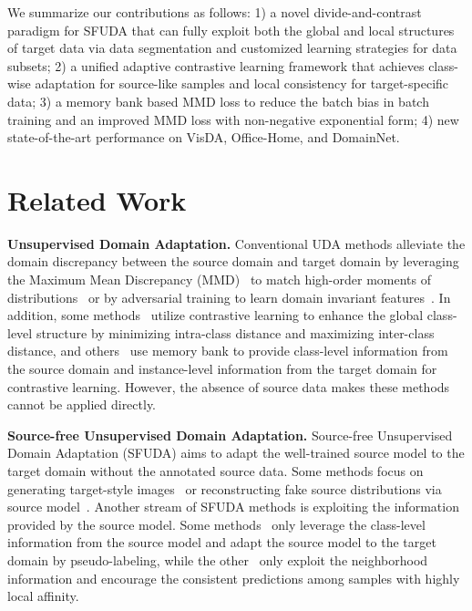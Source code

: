 \documentclass{article}
\begin{document}
We summarize our contributions as follows: 1) a novel divide-and-contrast paradigm for SFUDA that can fully exploit both the global and local structures of target data via data segmentation and customized learning strategies for data subsets; 2) a unified adaptive contrastive learning framework that achieves class-wise adaptation for source-like samples and local consistency for target-specific data; 3) a memory bank based MMD loss to reduce the batch bias in batch training and an
improved MMD loss with non-negative exponential form; 4) new state-of-the-art performance on VisDA, Office-Home, and DomainNet.



\section{Related Work}
\textbf{Unsupervised Domain Adaptation.}
Conventional UDA methods alleviate the domain discrepancy between the source domain and target domain by leveraging the Maximum Mean Discrepancy (MMD)~\cite{MMD} to match high-order moments of distributions~\cite{tzeng2014deep, CORAL, CMD} or by adversarial training to learn domain invariant features~\cite{ganin2015unsupervised,saito2018maximum}. In addition, some methods~\cite{Dai_2020_ACCV, Kang2019ContrastiveAN} utilize contrastive learning to enhance the global class-level structure by minimizing intra-class distance and maximizing inter-class distance, and others~\cite{saito2020dance,nips2020spcl} use memory bank to provide class-level information from the source domain and instance-level information from the target domain for contrastive learning. However, the absence of source data makes these methods cannot be applied directly.


\textbf{Source-free Unsupervised Domain Adaptation.}
Source-free Unsupervised Domain Adaptation (SFUDA) aims to adapt the well-trained source model to the target domain without the annotated source data. Some methods focus on generating target-style images~\cite{li2020model} or reconstructing fake source distributions via source model~\cite{VDMDA_arxiv_2021}. Another stream of SFUDA methods is exploiting the information provided by the source model. Some methods~\cite{shot,kim2020PrDA,arxiv_2021_chen, Qiu2021ijcai} only leverage the class-level information from the source model and adapt the source model to the target domain by pseudo-labeling, while the other~\cite{nrc_nips_2021,gsfda_iccv_2021} only exploit the neighborhood information and encourage the consistent predictions among samples with highly local affinity. 
\end{document}
